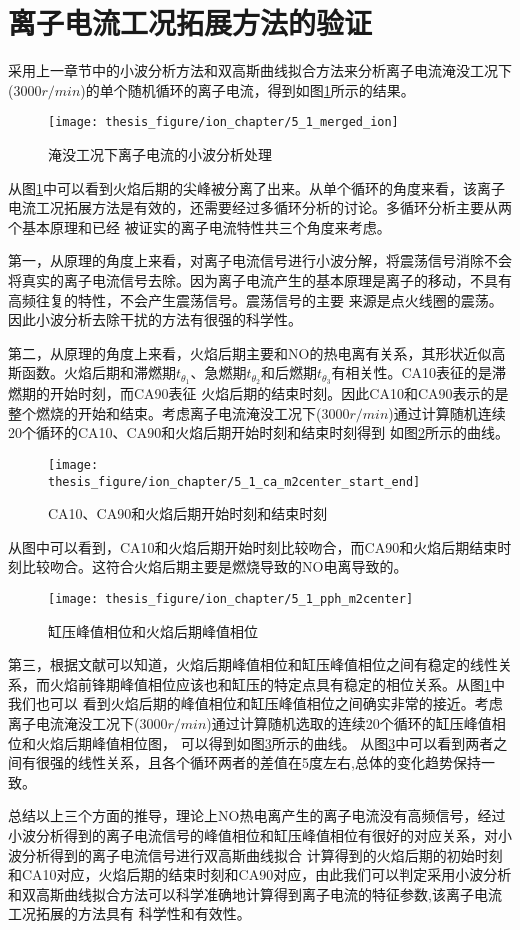 \section{离子电流工况拓展方法的验证}
采用上一章节中的小波分析方法和双高斯曲线拟合方法来分析离子电流淹没工况下($3000r/min$)的单个随机循环的离子电流，得到如图\ref{fig:5_1_merged_ion}所示的结果。
\begin{figure}[htb]
	\centering
	\texttt{[image: thesis\_figure/ion\_chapter/5\_1\_merged\_ion]}
	\caption{\label{fig:5_1_merged_ion}淹没工况下离子电流的小波分析处理}
\end{figure}
从图\ref{fig:5_1_merged_ion}中可以看到火焰后期的尖峰被分离了出来。从单个循环的角度来看，该离子电流工况拓展方法是有效的，还需要经过多循环分析的讨论。多循环分析主要从两个基本原理和已经
被证实的离子电流特性共三个角度来考虑。\par
第一，从原理的角度上来看，对离子电流信号进行小波分解，将震荡信号消除不会将真实的离子电流信号去除。因为离子电流产生的基本原理是离子的移动，不具有高频往复的特性，不会产生震荡信号。震荡信号的主要
来源是点火线圈的震荡。因此小波分析去除干扰的方法有很强的科学性。\par
第二，从原理的角度上来看，火焰后期主要和NO的热电离有关系，其形状近似高斯函数。火焰后期和滞燃期$t_{\theta_1}$、急燃期$t_{\theta_2}$和后燃期$t_{\theta_3}$有相关性。CA10表征的是滞燃期的开始时刻，而CA90表征
火焰后期的结束时刻。因此CA10和CA90表示的是整个燃烧的开始和结束。考虑离子电流淹没工况下($3000r/min$)通过计算随机连续20个循环的CA10、CA90和火焰后期开始时刻和结束时刻得到
如图\ref{fig:5_1_ca_m2center_start_end}所示的曲线。\par
\begin{figure}[htb]
	\centering
	\texttt{[image: thesis\_figure/ion\_chapter/5\_1\_ca\_m2center\_start\_end]}
	\caption{\label{fig:5_1_ca_m2center_start_end}CA10、CA90和火焰后期开始时刻和结束时刻}
\end{figure}
从图中可以看到，CA10和火焰后期开始时刻比较吻合，而CA90和火焰后期结束时刻比较吻合。这符合火焰后期主要是燃烧导致的NO电离导致的。\par
\begin{figure}[htb]
	\centering
	\texttt{[image: thesis\_figure/ion\_chapter/5\_1\_pph\_m2center]}
	\caption{\label{fig:5_1_pph_m2center}缸压峰值相位和火焰后期峰值相位}
\end{figure}
第三，根据文献可以知道，火焰后期峰值相位和缸压峰值相位之间有稳定的线性关系，而火焰前锋期峰值相位应该也和缸压的特定点具有稳定的相位关系。从图\ref{fig:5_1_merged_ion}中我们也可以
看到火焰后期的峰值相位和缸压峰值相位之间确实非常的接近。考虑离子电流淹没工况下($3000r/min$)通过计算随机选取的连续20个循环的缸压峰值相位和火焰后期峰值相位图，
可以得到如图\ref{fig:5_1_pph_m2center}所示的曲线。
从图\ref{fig:5_1_pph_m2center}中可以看到两者之间有很强的线性关系，且各个循环两者的差值在5度左右,总体的变化趋势保持一致。\par
总结以上三个方面的推导，理论上NO热电离产生的离子电流没有高频信号，经过小波分析得到的离子电流信号的峰值相位和缸压峰值相位有很好的对应关系，对小波分析得到的离子电流信号进行双高斯曲线拟合
计算得到的火焰后期的初始时刻和CA10对应，火焰后期的结束时刻和CA90对应，由此我们可以判定采用小波分析和双高斯曲线拟合方法可以科学准确地计算得到离子电流的特征参数,该离子电流工况拓展的方法具有
科学性和有效性。
